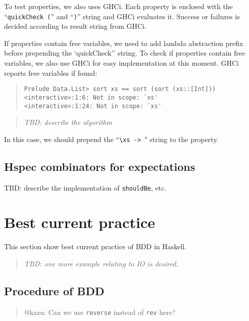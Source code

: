 \documentclass[preprint]{sigplanconf}
\begin{document}
To test properties, we also uses GHCi.
Each property is enclosed with
the ``\verb|quickCheck (|'' and ``\verb|)|'' string
and GHCi evaluates it.
Success or failures is decided according to result string from GHCi.

If properties contain free variables,
we need to add lambda abstraction prefix before prepending
the `quickCheck'' string.
To check if properties contain free variables,
we also use GHCi for easy implementation at this moment.
GHCi reports free variables if found:

\begin{quote}
\small
\begin{verbatim}
Prelude Data.List> sort xs == sort (sort (xs::[Int]))
<interactive>:1:6: Not in scope: `xs'
<interactive>:1:24: Not in scope: `xs'
\end{verbatim}
\end{quote}

\begin{quote}
    \emph{TBD: describe the algorithm}
\end{quote}


\noindent In this case, we should prepend the ``\verb|\xs -> |" string
to the property.


\subsection{Hspec combinators for expectations}
\label{sec:hspec-comb}

TBD: describe the implementation of {\tt shouldBe}, etc.


\section{Best current practice}
\label{ref:Best-current-practice}

This section show best current practice of
BDD in Haskell.

\begin{quote}
    \emph{TBD: one more example relating to IO is desired.}
\end{quote}

\subsection{Procedure of BDD}

\begin{quote}
@kazu: Can we use \verb|reverse| instead of \verb|rev| here?
\end{quote}
\end{document}
